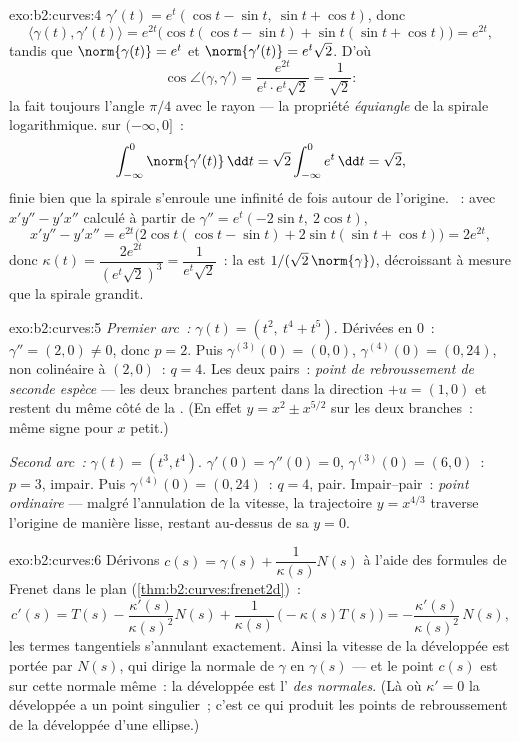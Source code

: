 \begin{solution}{exo:b2:curves:4}
$\gamma'(t) = e^t(\cos t - \sin t,\ \sin t + \cos t)$, donc
\[
\langle \gamma(t), \gamma'(t)\rangle = e^{2t}
\bigl(\cos t(\cos t - \sin t) + \sin t(\sin t + \cos t)\bigr)
= e^{2t},
\]
tandis que $\norm{\gamma(t)} = e^t$ et $\norm{\gamma'(t)} =
e^t\sqrt 2$. D'où
\[
\cos\angle\bigl(\gamma, \gamma'\bigr)
= \frac{e^{2t}}{e^t \cdot e^t\sqrt2} = \frac{1}{\sqrt2} :
\]
la  fait toujours l'angle $\pi/4$ avec le rayon --- la
propriété \emph{équiangle} de la spirale logarithmique.  sur $(-\infty, 0]$~:
\[
\int_{-\infty}^0 \norm{\gamma'(t)}\,\dd t
= \sqrt2\int_{-\infty}^0 e^t\,\dd t = \sqrt 2 ,
\]
finie bien que la spirale s'enroule une infinité de fois autour de
l'origine. ~: avec $x'y'' - y'x''$ calculé à partir de
$\gamma'' =
e^t(-2\sin t,\ 2\cos t)$,
\[
x'y'' - y'x'' = e^{2t}\bigl(2\cos t(\cos t - \sin t)
+ 2\sin t(\sin t + \cos t)\bigr) = 2e^{2t},
\]
donc $\kappa(t) = \dfrac{2e^{2t}}{(e^t\sqrt2)^3} =
\dfrac{1}{e^t\sqrt2}$~: la  est $1/(\sqrt2\,
\norm{\gamma})$, décroissant à mesure que la spirale grandit.
\end{solution}

\begin{solution}{exo:b2:curves:5}
\emph{Premier arc~:} $\gamma(t) = (t^2,\ t^4 + t^5)$. Dérivées en
$0$~: $\gamma'' = (2, 0) \neq 0$, donc $p = 2$. Puis $\gamma^{(3)}(0)
= (0, 0)$, $\gamma^{(4)}(0) = (0, 24)$, non colinéaire à $(2,
0)$~: $q = 4$. Les deux pairs~: \emph{point de rebroussement de
seconde espèce} --- les deux
branches partent dans la direction $+u = (1,0)$ et restent du même
côté de la . (En effet $y = x^2 \pm x^{5/2}$ sur les deux
branches~: même signe pour $x$ petit.)

\emph{Second arc~:} $\gamma(t) = (t^3, t^4)$. $\gamma'(0) =
\gamma''(0) = 0$, $\gamma^{(3)}(0) = (6, 0)$~: $p = 3$, impair. Puis
$\gamma^{(4)}(0) = (0, 24)$~: $q = 4$, pair. Impair--pair~:
\emph{point ordinaire} --- malgré l'annulation de la vitesse, la
trajectoire $y = x^{4/3}$ traverse l'origine de manière lisse,
restant au-dessus de sa  $y = 0$.
\end{solution}

\begin{solution}{exo:b2:curves:6}
Dérivons $c(s) = \gamma(s) + \dfrac{1}{\kappa(s)}N(s)$ à l'aide des
formules de Frenet dans le plan
(\cref{thm:b2:curves:frenet2d})~:
\[
c'(s) = T(s) - \frac{\kappa'(s)}{\kappa(s)^2}N(s)
+ \frac{1}{\kappa(s)}\,\bigl(-\kappa(s)T(s)\bigr)
= -\frac{\kappa'(s)}{\kappa(s)^2}\,N(s) ,
\]
les termes tangentiels s'annulant exactement. Ainsi la vitesse de
la développée est portée par $N(s)$, qui dirige la normale de
$\gamma$ en $\gamma(s)$ --- et le point $c(s)$ est sur cette
normale même~: la développée est l'\emph{ des normales}.
(Là où $\kappa' = 0$ la développée a un point singulier~; c'est
ce qui produit les points de rebroussement de la développée d'une
ellipse.)
\end{solution}

